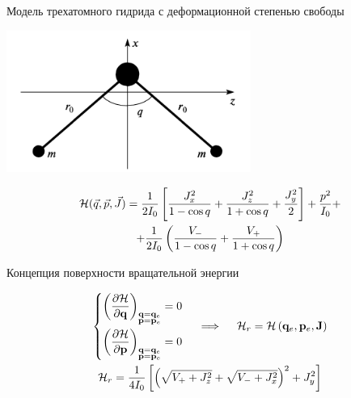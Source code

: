 \documentclass[hyperref={pdfpagelabels=false},usepdftitle=false, xcolor = dvipsnames]{beamer}
\begin{document}
\begin{frame}{Модель трехатомного гидрида с деформационной степенью свободы}
  \begin{block}{}
	\begin{center}
	  \includegraphics[width=0.6\textwidth]{../pictures/triatomic_fixed.png}
	\end{center}

	\vspace*{-1cm}
	\begin{gather}
	  \mathcal{H}(\vec{q}, \vec{p}, \vec{J}) = \frac{1}{2I_0} \left[ \frac{J_x^2}{1-\cos q} + \frac{J_z^2}{1 + \cos q} + \frac{J_y^2}{2} \right] + \frac{p^2}{I_0} + \notag \\
	  + \frac{1}{2I_0} \left( \frac{V_{-}}{1 - \cos q} + \frac{V_{+}}{1 + \cos q} \right) \notag
	\end{gather}
  \end{block}
\end{frame}

\begin{frame}{Концепция поверхности вращательной энергии}
  \begin{varblock}[11cm]{}
	\begin{gather}
	  \left\{
	  \begin{aligned}
	    \left( \frac{\partial \mathcal{H}}{\partial \mathbf{q}} \right)_{\substack{\mathbf{q} = \mathbf{q}_e \\ \mathbf{p} = \mathbf{p}_e}} = 0 \\
		 \left( \frac{\partial \mathcal{H}}{\partial \mathbf{p}} \right)_{\substack{\mathbf{q} = \mathbf{q}_e \\ \mathbf{p} = \mathbf{p}_e}} = 0	     
	  \end{aligned}
	  \right.
	  \quad \implies \quad
	  \mathcal{H}_r = \mathcal{H} \left( \mathbf{q}_e, \mathbf{p}_e, \mathbf{J} \right)
	  \notag \\
	  \mathcal{H}_r = \frac{1}{4I_0} \left[ \left( \sqrt{V_{+} + J_z^2} + \sqrt{V_{-} + J_x^2} \right)^2 + J_y^2 \right] \notag
	  \end{gather}
  \end{varblock}
  
\end{frame}
\end{document}

